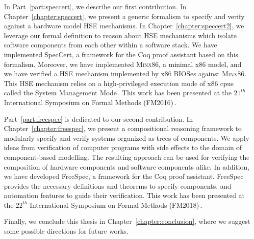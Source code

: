 In Part~\ref{part:speccert}, we describe our first contribution.
%
In Chapter~\ref{chapter:speccert}, we present a generic formalism to specify and
verify against a hardware model HSE mechanisms.
%
In Chapter~\ref{chapter:speccert2}, we leverage our formal definition to reason
about HSE mechanisms which isolate software components from each other within a
software stack.
%
We have implemented SpecCert, a framework for the Coq proof assistant based on
this formalism.
%
Moreover, we have implemented {\scshape Minx86}, a minimal x86 model, and we
have verified a HSE mechanism implemented by x86 BIOSes against {\scshape
  Minx86}.
%
This HSE mechanism relies on a high-privileged execution mode of x86 \acp{cpu}
called the System Management Mode\,\cite{intel2014manual}.
%
This work has been presented at the $21^{th}$ International Symposium on Formal
Methods (FM2016)\,\cite{letan2016speccert}.

Part~\ref{part:freespec} is dedicated to our second contribution.
%
In Chapter~\ref{chapter:freespec}, we present a compositional reasoning
framework to modularly specify and verify systems organized as trees of
components.
%
We apply ideas from verification of computer programs with side effects to the
domain of component-based modelling. The resulting approach can be used for
verifying the composition of hardware components and software components alike.
%
In addition, we have developed FreeSpec, a framework for the Coq proof
assistant.
%
FreeSpec provides the necessary definitions and theorems to specify components,
and automation features to guide their verification.
%
This work has been presented at the $22^{th}$ International Symposium on Formal
Methods (FM2018)\,\cite{letan2018freespec}.

Finally, we conclude this thesis in Chapter~\ref{chapter:conclusion}, where we
suggest some possible directions for future works.
